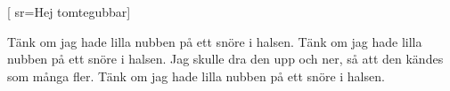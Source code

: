 
[ 					
	sr={Hej tomtegubbar}]	
	
\beginverse*						
Tänk om jag hade lilla nubben på ett snöre i halsen.
Tänk om jag hade lilla nubben på ett snöre i halsen.
Jag skulle dra den upp och ner,
så att den kändes som många fler.
Tänk om jag hade lilla nubben på ett snöre i halsen.
\endverse							
\endsong		
		